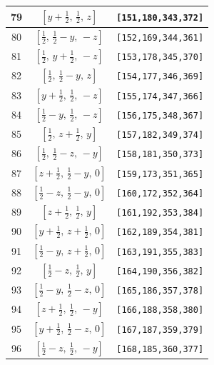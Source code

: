 \documentclass[fleqn,8pt]{jsarticle}
\begin{document}
\begin{longtable}{ccc}
79 & $\left[ y + \frac{1}{2},\, \frac{1}{2},\, z \right]$ & {\tt [151,180,343,372]} \\ \hline
80 & $\left[ \frac{1}{2},\, \frac{1}{2} - y,\, - z \right]$ & {\tt [152,169,344,361]} \\ \hline
81 & $\left[ \frac{1}{2},\, y + \frac{1}{2},\, - z \right]$ & {\tt [153,178,345,370]} \\ \hline
82 & $\left[ \frac{1}{2},\, \frac{1}{2} - y,\, z \right]$ & {\tt [154,177,346,369]} \\ \hline
83 & $\left[ y + \frac{1}{2},\, \frac{1}{2},\, - z \right]$ & {\tt [155,174,347,366]} \\ \hline
84 & $\left[ \frac{1}{2} - y,\, \frac{1}{2},\, - z \right]$ & {\tt [156,175,348,367]} \\ \hline
85 & $\left[ \frac{1}{2},\, z + \frac{1}{2},\, y \right]$ & {\tt [157,182,349,374]} \\ \hline
86 & $\left[ \frac{1}{2},\, \frac{1}{2} - z,\, - y \right]$ & {\tt [158,181,350,373]} \\ \hline
87 & $\left[ z + \frac{1}{2},\, \frac{1}{2} - y,\, 0 \right]$ & {\tt [159,173,351,365]} \\ \hline
88 & $\left[ \frac{1}{2} - z,\, \frac{1}{2} - y,\, 0 \right]$ & {\tt [160,172,352,364]} \\ \hline
89 & $\left[ z + \frac{1}{2},\, \frac{1}{2},\, y \right]$ & {\tt [161,192,353,384]} \\ \hline
90 & $\left[ y + \frac{1}{2},\, z + \frac{1}{2},\, 0 \right]$ & {\tt [162,189,354,381]} \\ \hline
91 & $\left[ \frac{1}{2} - y,\, z + \frac{1}{2},\, 0 \right]$ & {\tt [163,191,355,383]} \\ \hline
92 & $\left[ \frac{1}{2} - z,\, \frac{1}{2},\, y \right]$ & {\tt [164,190,356,382]} \\ \hline
93 & $\left[ \frac{1}{2} - y,\, \frac{1}{2} - z,\, 0 \right]$ & {\tt [165,186,357,378]} \\ \hline
94 & $\left[ z + \frac{1}{2},\, \frac{1}{2},\, - y \right]$ & {\tt [166,188,358,380]} \\ \hline
95 & $\left[ y + \frac{1}{2},\, \frac{1}{2} - z,\, 0 \right]$ & {\tt [167,187,359,379]} \\ \hline
96 & $\left[ \frac{1}{2} - z,\, \frac{1}{2},\, - y \right]$ & {\tt [168,185,360,377]} \\
\end{longtable}
\renewcommand{\arraystretch}{1.2}
\end{document}
